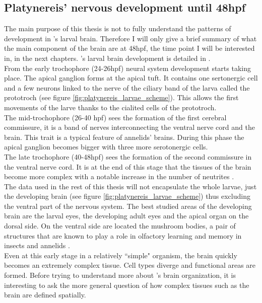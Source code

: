      \subsection{Platynereis' nervous development until 48hpf}
     The main purpose of this thesis is not to fully understand the patterns of development in \platy{}'s larval brain. Therefore I will only give a brief summary of what the main component of the brain are at 48hpf, the time point I will be interested in, in the next chapters. \platy{}'s larval brain development is detailed in \cite{Fischer10}.\\
     From the early trochophore (24-26hpf) neural system development starts taking place. The apical ganglion forms at the apical tuft. It contains one sertonergic cell and a few neurons linked to the nerve of the ciliary band of the larva called the prototroch (see figure \ref{fig:platynereis_larvae_scheme}). This allows the first movements of the larve thanks to the cialited cells of the prototroch.\\
     The mid-trochophore (26-40 hpf) sees the formation of the first cerebral commissure, it is a band of nerves interconnecting the ventral nerve cord and the brain. This trait is a typical feature of annelids' brains. During this phase the apical ganglion becomes bigger with three more serotonergic cells.\\
     The late trochophore (40-48hpf) sees the formation of the second commissure in the ventral nerve cord. It is at the end of this stage that the tissues of the brain become more complex with a notable increase in the number of neutrites \cite{Fischer10}.\\
     The data used in the rest of this thesis will not encapsulate the whole larvae, just the developing brain (see figure \ref{fig:platynereis_larvae_scheme}) thus excluding the ventral part of the nervous system. The best studied areas of the developing brain are the larval eyes, the developing adult eyes and the apical organ on the dorsal side. On the ventral side are located the mushroom bodies, a pair of structures that are known to play a role in olfactory learning and memory in insects and annelids \cite{Tomer10}.\\
     
     Even at this early stage in a relatively ``simple" organism, the brain quickly becomes an extremely complex tissue. Cell types diverge and functional areas are formed. Before trying to understand more about \platy{}'s brain organization, it is interesting to ask the more general question of how complex tissues such as the brain are defined spatially.
     
